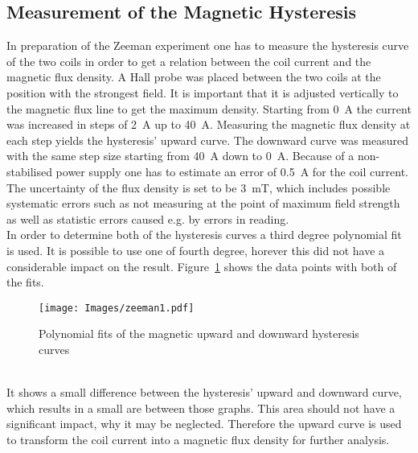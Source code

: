\subsection{Measurement of the Magnetic Hysteresis}
\label{toc:Hysteresis}
In preparation of the Zeeman experiment one has to measure the hysteresis curve of the two coils in order to get a relation between the coil current and the magnetic flux density. 
A Hall probe was placed between the two coils at the position with the strongest field.  
It is important that it is adjusted vertically to the magnetic flux line to get the maximum density. 
Starting from \SI{0}{\ampere} the current was increased in steps of \SI{2}{\ampere} up to \SI{40}{\ampere}. 
Measuring the magnetic flux density at each step yields the hysteresis' upward curve. 
The downward curve was measured with the same step size starting from \SI{40}{\ampere} down to \SI{0}{\ampere}. 
Because of a non-stabilised power supply one has to estimate an error of \SI{0.5}{\ampere} for the coil current. 
The uncertainty of the flux density is set to be \SI{3}{\milli\tesla}, which includes possible systematic errors such as not measuring at the point of maximum field strength as well as statistic errors caused e.g. by errors in reading.\\
In order to determine both of the hysteresis curves a third degree polynomial fit is used. 
It is possible to use one of fourth degree, horever this did not have a considerable impact on the result. 
Figure~\ref{fig:MagHys} shows the data points with both of the fits. 
\begin{figure}[ht]
	\centering
	\texttt{[image: Images/zeeman1.pdf]}
	\caption[Magnetic Hysteresis Curve]{Polynomial fits of the magnetic upward and downward hysteresis curves}
	\label{fig:MagHys}
\end{figure}\\
It shows a small difference between the hysteresis' upward and downward curve, which results in a small are between those graphs. 
This area should not have a significant impact, why it may be neglected. 
Therefore the upward curve is used to transform the coil current into a magnetic flux density for further analysis.
